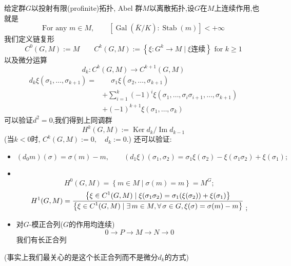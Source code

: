 \documentclass[12pt,A4paper,oneside,reqno]{amsart}
\numberwithin{equation}{section}
\theoremstyle{definition}
\theoremstyle{plain}
\theoremstyle{plain}
\numberwithin{equation}{section}
\theoremstyle{remark}
\DeclareMathOperator{\Ker}{\operatorname{Ker}}
\DeclareMathOperator{\Img}{\operatorname{Im}}
\newcommand{\Gal}{\operatorname{Gal}}
\newcommand{\Stab}{\operatorname{Stab}}
\begin{document}
给定群$G$以投射有限(profinite)拓扑, Abel 群$M$以离散拓扑,设$G$在$M$上连续作用,也就是
$$ \text{For any } m \in M,\qquad [\Gal(\bar{K}/K):\Stab(m)] < +\infty$$
我们定义链复形
$$C^0(G,M):=M\qquad C^k(G,M):= \left\{\xi: G^k \rightarrow M \mid \xi \text{连续}\right\} \text{ for } k\geqslant 1$$
以及微分运算
$$d_k:C^k(G,M) \longrightarrow C^{k+1}(G,M)$$
\begin{equation*}
\begin{aligned}
d_k\xi (\sigma_1, \ldots,\sigma_{k+1})=&\phantom{+}\sigma_1\xi (\sigma_2, \ldots , \sigma_{k+1})\\
&+\sum_{i=1}^{k}(-1)^i\xi (\sigma_1, \ldots,\sigma_i\sigma_{i+1}, \ldots,\sigma_{k+1})\\
&+(-1)^{k+1}\xi (\sigma_1,\ldots,\sigma_k)
\end{aligned}
\end{equation*}
可以验证$d^2=0$,我们得到上同调群$$H^k(G,M):=\Ker d_k /\Img d_{k-1}$$
(当$k<0$时, $C^k(G,M):=0, \quad d_k:=0.$)
还可以验证:
\begin{itemize}
	\item $(d_0 m) (\sigma)=\sigma(m) -m, 	\qquad (d_1 \xi) (\sigma_1,\sigma_2)=\sigma_1 \xi(\sigma_2)-\xi(\sigma_1\sigma_2)+\xi(\sigma_1);$
	\item \phantom{1}\\[-1cm] $$H^0(G,M)=\left\{m \in M \mid \sigma(m)=m\right\}=M^G;$$
	$$H^1(G,M)=\frac{\displaystyle\left\{\xi \in C^1(G,M) \mid \xi (\sigma_1\sigma_2)=\sigma_1(\xi(\sigma_2))+\xi(\sigma_1)\right\}}{\displaystyle\left\{\xi \in C^1(G,M) \mid\exists\, m \in M,\forall\,\sigma \in G, \xi(\sigma)=\sigma(m)-m\right\}}\;\raisebox{-10pt}{;}$$
	\item 对$G$-模正合列($G$的作用均连续)
	$$0 \longrightarrow P \longrightarrow M \longrightarrow N \longrightarrow 0$$
	我们有长正合列
	\begin{center}
	\end{center}
\end{itemize}
(事实上我们最关心的是这个长正合列而不是微分$d_k$的方式)
\end{document}
